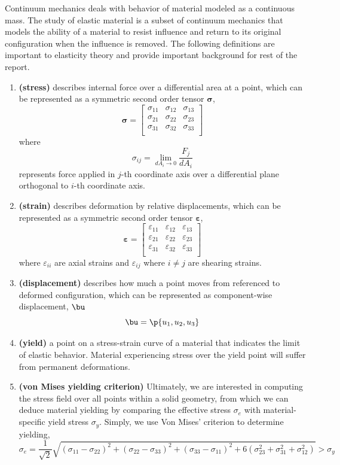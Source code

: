 \documentclass[11pt,titlepage]{article}
\newcommand{\bheading}[1]{\textbf{(#1)}}
\newcommand{\bsigma}{\boldsymbol{\sigma}}
\newcommand{\bepsilon}{\boldsymbol{\varepsilon}}
\renewcommand{\epsilon}{\varepsilon}
\begin{document}
Continuum mechanics deals with behavior of material modeled as a continuous mass. The study of elastic material is a subset of continuum mechanics that models the ability of a material to resist influence and return to its original configuration when the influence is removed. The following definitions are important to elasticity theory and provide important background for rest of the report.~\cite{bauchau_craig_2009}

\begin{enumerate}
    \item \bheading{stress} describes internal force over a differential area at a point, which can be represented as a symmetric second order tensor $\bsigma$,
    \[
        \bsigma = 
        \begin{bmatrix}
            \sigma_{11} & \sigma_{12} & \sigma_{13} \\
            \sigma_{21} & \sigma_{22} & \sigma_{23} \\
            \sigma_{31} & \sigma_{32} & \sigma_{33} \\
        \end{bmatrix}    
    \]
    where
    \[
        \sigma_{ij} = \lim_{dA_i \to 0} \dfrac{F_j}{dA_i}
    \] 
    represents force applied in $j$-th coordinate axis over a differential plane orthogonal to $i$-th coordinate axis. 
    \item \bheading{strain} describes deformation by relative displacements, which can be represented as a symmetric second order tensor $\bepsilon$,
    \[
        \bepsilon = 
        \begin{bmatrix}
            \epsilon_{11} & \epsilon_{12} & \epsilon_{13} \\
            \epsilon_{21} & \epsilon_{22} & \epsilon_{23} \\
            \epsilon_{31} & \epsilon_{32} & \epsilon_{33} \\
        \end{bmatrix}
    \]
    where $\epsilon_{ii}$ are axial strains and $\epsilon_{ij}$ where $i\neq j$ are shearing strains.
    \item \bheading{displacement} describes how much a point moves from referenced to deformed configuration, which can be represented as component-wise displacement, $\bu$
    \[
        \bu = \p{u_1, u_2, u_3}
    \]
    \item \bheading{yield} a point on a stress-strain curve of a material that indicates the limit of elastic behavior. Material experiencing stress over the yield point will suffer from permanent deformations.
    \item \bheading{von Mises yielding criterion} Ultimately, we are interested in computing the stress field over all points within a solid geometry, from which we can deduce material yielding by comparing the effective stress $\sigma_e$ with material-specific yield stress $\sigma_y$. Simply, we use Von Mises' criterion to determine yielding, 
    \[
        \sigma_e = \frac{1}{\sqrt{2}}\sqrt{
            (\sigma_{11} - \sigma_{22})^2 
            + (\sigma_{22} - \sigma_{33})^2 
            + (\sigma_{33} - \sigma_{11})^2
            + 6(\sigma_{23}^2 + \sigma_{31}^2 + \sigma_{12}^2)
        } > \sigma_y
    \]
\end{enumerate}
\end{document}
